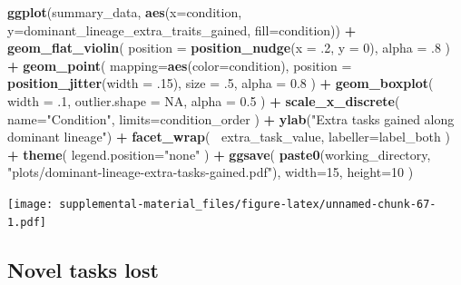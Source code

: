 \documentclass[]{book}
\newenvironment{Shaded}{\begin{snugshade}}{\end{snugshade}}
\newcommand{\DataTypeTok}[1]{\textcolor[rgb]{0.13,0.29,0.53}{#1}}
\newcommand{\DecValTok}[1]{\textcolor[rgb]{0.00,0.00,0.81}{#1}}
\newcommand{\FloatTok}[1]{\textcolor[rgb]{0.00,0.00,0.81}{#1}}
\newcommand{\KeywordTok}[1]{\textcolor[rgb]{0.13,0.29,0.53}{\textbf{#1}}}
\newcommand{\NormalTok}[1]{#1}
\newcommand{\OperatorTok}[1]{\textcolor[rgb]{0.81,0.36,0.00}{\textbf{#1}}}
\newcommand{\OtherTok}[1]{\textcolor[rgb]{0.56,0.35,0.01}{#1}}
\newcommand{\StringTok}[1]{\textcolor[rgb]{0.31,0.60,0.02}{#1}}
\begin{document}
\begin{Shaded}
\begin{Highlighting}[]
\KeywordTok{ggplot}\NormalTok{(summary_data, }\KeywordTok{aes}\NormalTok{(}\DataTypeTok{x=}\NormalTok{condition, }\DataTypeTok{y=}\NormalTok{dominant_lineage_extra_traits_gained, }\DataTypeTok{fill=}\NormalTok{condition)) }\OperatorTok{+}
\StringTok{  }\KeywordTok{geom_flat_violin}\NormalTok{(}
    \DataTypeTok{position =} \KeywordTok{position_nudge}\NormalTok{(}\DataTypeTok{x =} \FloatTok{.2}\NormalTok{, }\DataTypeTok{y =} \DecValTok{0}\NormalTok{),}
    \DataTypeTok{alpha =} \FloatTok{.8}
\NormalTok{  ) }\OperatorTok{+}
\StringTok{  }\KeywordTok{geom_point}\NormalTok{(}
    \DataTypeTok{mapping=}\KeywordTok{aes}\NormalTok{(}\DataTypeTok{color=}\NormalTok{condition),}
    \DataTypeTok{position =} \KeywordTok{position_jitter}\NormalTok{(}\DataTypeTok{width =} \FloatTok{.15}\NormalTok{),}
    \DataTypeTok{size =} \FloatTok{.5}\NormalTok{,}
    \DataTypeTok{alpha =} \FloatTok{0.8}
\NormalTok{  ) }\OperatorTok{+}
\StringTok{  }\KeywordTok{geom_boxplot}\NormalTok{(}
    \DataTypeTok{width =} \FloatTok{.1}\NormalTok{,}
    \DataTypeTok{outlier.shape =} \OtherTok{NA}\NormalTok{,}
    \DataTypeTok{alpha =} \FloatTok{0.5}
\NormalTok{  ) }\OperatorTok{+}
\StringTok{  }\KeywordTok{scale_x_discrete}\NormalTok{(}
    \DataTypeTok{name=}\StringTok{"Condition"}\NormalTok{,}
    \DataTypeTok{limits=}\NormalTok{condition_order}
\NormalTok{  ) }\OperatorTok{+}
\StringTok{  }\KeywordTok{ylab}\NormalTok{(}\StringTok{"Extra tasks gained along dominant lineage"}\NormalTok{) }\OperatorTok{+}
\StringTok{  }\KeywordTok{facet_wrap}\NormalTok{(}
    \OperatorTok{~}\NormalTok{extra_task_value,}
    \DataTypeTok{labeller=}\NormalTok{label_both}
\NormalTok{  ) }\OperatorTok{+}
\StringTok{  }\KeywordTok{theme}\NormalTok{(}
    \DataTypeTok{legend.position=}\StringTok{"none"}
\NormalTok{  ) }\OperatorTok{+}
\StringTok{  }\KeywordTok{ggsave}\NormalTok{(}
    \KeywordTok{paste0}\NormalTok{(working_directory, }\StringTok{"plots/dominant-lineage-extra-tasks-gained.pdf"}\NormalTok{),}
    \DataTypeTok{width=}\DecValTok{15}\NormalTok{,}
    \DataTypeTok{height=}\DecValTok{10}
\NormalTok{  )}
\end{Highlighting}
\end{Shaded}

\texttt{[image: supplemental-material\_files/figure-latex/unnamed-chunk-67-1.pdf]}

\hypertarget{novel-tasks-lost}{%
\subsection{Novel tasks lost}\label{novel-tasks-lost}}
\end{document}
